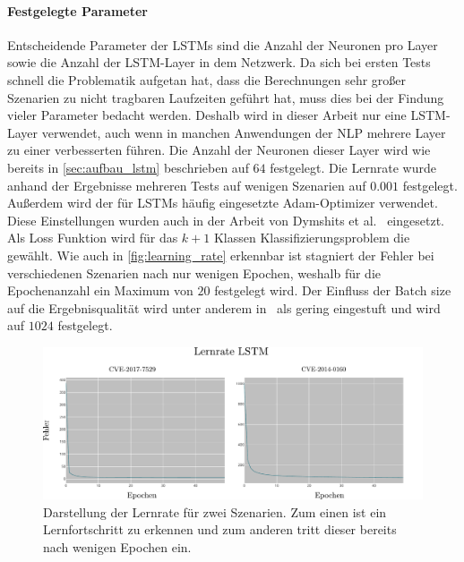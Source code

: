             \paragraph{Festgelegte Parameter}
                Entscheidende Parameter der \acp{LSTM} sind die Anzahl der Neuronen pro Layer sowie die Anzahl der \ac{LSTM}-Layer in dem Netzwerk.
                Da sich bei ersten Tests schnell die Problematik aufgetan hat, dass die Berechnungen sehr großer Szenarien zu nicht tragbaren Laufzeiten geführt hat, muss dies bei der Findung vieler Parameter bedacht werden.
                Deshalb wird in dieser Arbeit nur eine \ac{LSTM}-Layer verwendet, auch wenn in manchen Anwendungen der \ac{NLP} mehrere Layer zu einer verbesserten  führen.\cite{LSTMHYPERAUFA2020}
                Die Anzahl der Neuronen dieser Layer wird wie bereits in \autoref{sec:aufbau_lstm} beschrieben auf $64$ festgelegt.
                Die Lernrate wurde anhand der Ergebnisse mehreren Tests auf wenigen Szenarien auf $0.001$ festgelegt.
                Außerdem wird der für \acp{LSTM} häufig eingesetzte Adam-Optimizer verwendet.
                Diese Einstellungen wurden auch in der Arbeit von Dymshits et al.~\cite{LSTMDYMSHITS2017} eingesetzt.
                Als Loss Funktion wird für das $k+1$ Klassen Klassifizierungsproblem die  gewählt.
                Wie auch in \autoref{fig:learning_rate} erkennbar ist stagniert der Fehler bei verschiedenen Szenarien nach nur wenigen Epochen, weshalb für die Epochenanzahl ein Maximum von $20$ festgelegt wird.
                Der Einfluss der Batch size auf die Ergebnisqualität wird unter anderem in~\cite{LSTMBENCHBREUEL2015} als gering eingestuft und wird auf $1024$ festgelegt.
                 
                
                \begin{figure}
                    \centering
                    \includegraphics[width=\textwidth]{images/learning_rate.pdf}
                    \caption{Darstellung der Lernrate für zwei Szenarien.
                             Zum einen ist ein Lernfortschritt zu erkennen und zum anderen tritt dieser bereits nach wenigen Epochen ein.}\label{fig:learning_rate}
                \end{figure}

